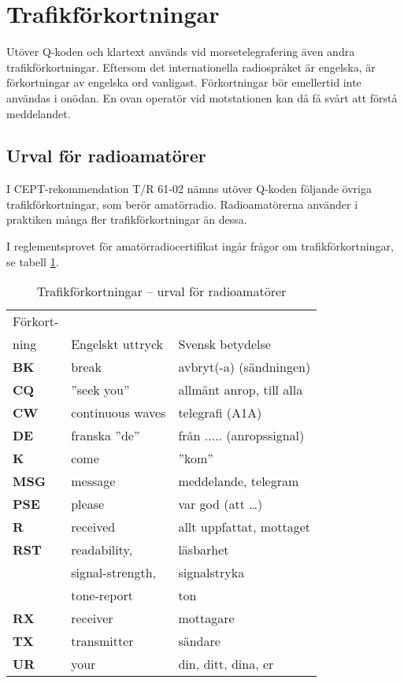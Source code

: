 \section{Trafikförkortningar}

Utöver Q-koden och klartext används vid morsetelegrafering även andra
trafikförkortningar.
Eftersom det internationella radiospråket är engelska, är förkortningar av
engelska ord vanligast.
Förkortningar bör emellertid inte användas i onödan.
En ovan operatör vid motstationen kan då få svårt att förstå meddelandet.

\subsection{Urval för radioamatörer}

I CEPT-rekommendation T/R 61-02 nämns utöver Q-koden följande övriga
trafikförkortningar, som berör amatörradio.
Radioamatörerna använder i praktiken många fler trafikförkortningar än dessa.

I reglementsprovet för amatörradiocertifikat ingår frågor om
trafikförkortningar, se tabell \ref{tab:trafikforkortningar}.

\begin{table}
  \caption{Trafikförkortningar -- urval för radioamatörer}
  \label{tab:trafikforkortningar}
  \begin{tabular}{lll}
    Förkort- & & \\
    ning & Engelskt uttryck & Svensk betydelse \\
    \hline
    \textbf{BK} & break & avbryt(-a) (sändningen) \\
    \textbf{CQ} & ''seek you'' & allmänt anrop, till alla \\
    \textbf{CW} & continuous waves & telegrafi (A1A) \\
    \textbf{DE} & franska ''de'' & från ..... (anropssignal) \\
    \textbf{K}  & come & ''kom'' \\
    \textbf{MSG} & message & meddelande, telegram \\
    \textbf{PSE} & please & var god (att \dots) \\
    \textbf{R} & received & allt uppfattat, mottaget \\
    \textbf{RST} & readability, & läsbarhet \\
   & signal-strength, & signalstryka \\
   & tone-report & ton \\
    \textbf{RX} & receiver & mottagare \\
    \textbf{TX} & transmitter & sändare \\
    \textbf{UR} & your & din, ditt, dina, er \\
  \end{tabular}
\end{table}

